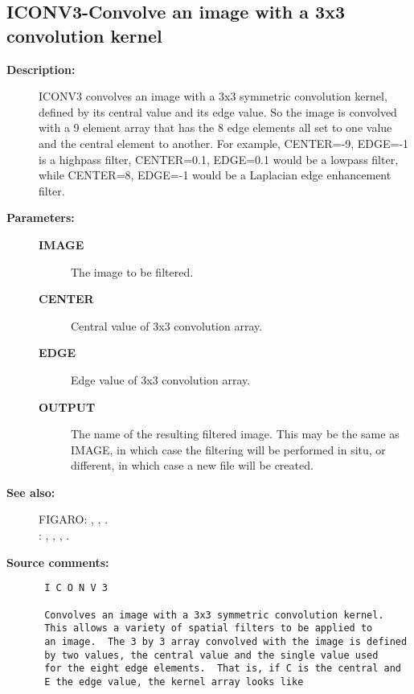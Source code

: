\subsection{ICONV3-\label{ICONV3}Convolve an image with a 3x3 convolution kernel}
\begin{description}

\item [{\bf Description:}]
 ICONV3 convolves an image with a 3x3 symmetric convolution
 kernel, defined by its central value and its edge value.  So
 the image is convolved with a 9 element array that has the 8
 edge elements all set to one value and the central element to
 another.  For example, CENTER=-9, EDGE=-1 is a highpass filter,
 CENTER=0.1, EDGE=0.1 would be a lowpass filter, while CENTER=8,
 EDGE=-1 would be a Laplacian edge enhancement filter.

\item [{\bf Parameters:}]
\begin{description}
\item [{\bf IMAGE}]
 The image to be filtered.
\item [{\bf CENTER}]
 Central value of 3x3 convolution array.
\item [{\bf EDGE}]
 Edge value of 3x3 convolution array.
\item [{\bf OUTPUT}]
 The name of the resulting filtered image.  This may
 be the same as IMAGE, in which case the filtering
 will be performed in situ, or different, in which
 case a new file will be created.
\end{description}

\item [{\bf See also:}]
FIGARO: , , .\\
: , , , .\\

\item [{\bf Source comments:}]
\begin{verbatim}
 I C O N V 3

 Convolves an image with a 3x3 symmetric convolution kernel.
 This allows a variety of spatial filters to be applied to
 an image.  The 3 by 3 array convolved with the image is defined
 by two values, the central value and the single value used
 for the eight edge elements.  That is, if C is the central and
 E the edge value, the kernel array looks like


\end{verbatim}
\end{description}

